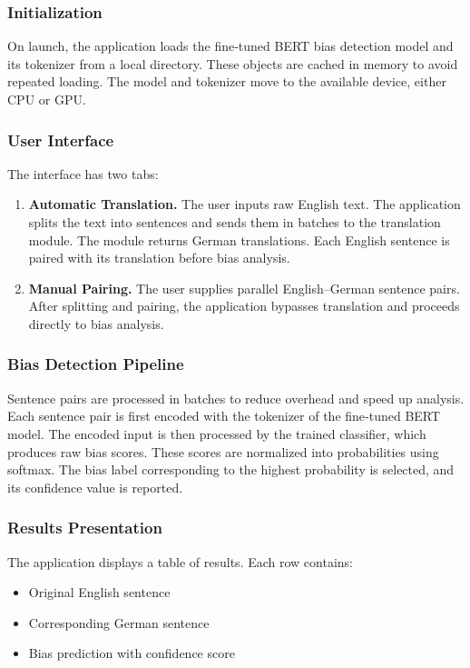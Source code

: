 \subsubsection{Initialization} 
On launch, the application loads the fine‑tuned BERT bias detection model and its tokenizer from a local directory. These objects are cached in memory to avoid repeated loading. The model and tokenizer move to the available device, either CPU or GPU.

\subsubsection{User Interface} 
The interface has two tabs:
\begin{enumerate}
  \item \textbf{Automatic Translation.} The user inputs raw English text. The application splits the text into sentences and sends them in batches to the translation module. The module returns German translations. Each English sentence is paired with its translation before bias analysis.
  \item \textbf{Manual Pairing.} The user supplies parallel English–German sentence pairs. After splitting and pairing, the application bypasses translation and proceeds directly to bias analysis.
\end{enumerate}

\subsubsection{Bias Detection Pipeline} 
Sentence pairs are processed in batches to reduce overhead and speed up analysis. Each sentence pair is first encoded with the tokenizer of the fine‑tuned BERT model. The encoded input is then processed by the trained classifier, which produces raw bias scores. These scores are normalized into probabilities using softmax. The bias label corresponding to the highest probability is selected, and its confidence value is reported.

\subsubsection{Results Presentation} 
The application displays a table of results. Each row contains:
\begin{itemize}
  \item Original English sentence
  \item Corresponding German sentence
  \item Bias prediction with confidence score
\end{itemize}

